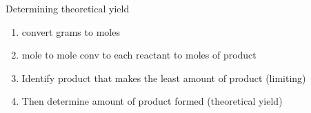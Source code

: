 \documentclass{article}
\begin{document}
Determining theoretical yield
\begin{enumerate}
  \item convert grams to moles
  \item mole to mole conv to each reactant to moles of product
  \item Identify product that makes the least amount of product (limiting)
  \item Then determine amount of product formed (theoretical yield)
\end{enumerate}
\end{document}

